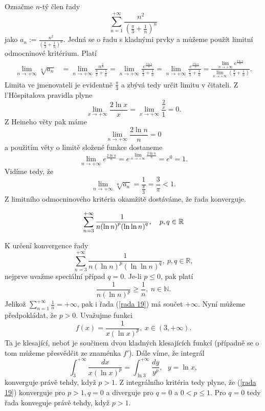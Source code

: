 \documentclass[answers]{exam}
\let\originalleft\left
\let\originalright\right
\renewcommand{\left}{\mathopen{}\mathclose\bgroup\originalleft}
\renewcommand{\right}{\aftergroup\egroup\originalright}
\begin{document}
\begin{questions}
  \begin{solution}
		Ozna\v cme $n$-t\'y \v clen \v rady 
		$$\sum\limits_{n=1}^{+\infty}\frac{n^2}{(\frac{\pi}{3}+\frac{1}{n})^n}$$
		jako $a_n:=\frac{n^2}{(\frac{\pi}{3}+\frac{1}{n})^n}$. Jedn\'a se o \v radu s kladn\'ymi prvky a m\r u\v zeme pou\v z\'it limitní odmocninové krit\'erium. Plat\'i 
		\begin{align*}
		\lim\limits_{n\to+\infty}\sqrt[n]{a_n}&=\lim\limits_{n\to+\infty}\frac{n^\frac{2}{n}}{\frac{\pi}{3}+\frac{1}{n}}=\lim\limits_{n\to+\infty}\frac{e^\frac{2\ln n}{n}}{\frac{\pi}{3}+\frac{1}{n}}=\lim\limits_{n\to+\infty}\frac{e^\frac{2\ln n}{n}}{\frac{\pi}{3}+\frac{1}{n}}=\frac{\lim\limits_{n\to+\infty}e^\frac{2\ln n}{n}}{\lim\limits_{n\to+\infty}(\frac{\pi}{3}+\frac{1}{n})}.
		\end{align*}
		Limita ve jmenovateli je evidentn\v e $\frac{\pi}{3}$ a zb\'yv\'a tedy ur\v cit limitu v \v citateli. Z l'H\^{o}spitalova pravidla plyne 
		$$\lim\limits_{x\to+\infty}\frac{2\ln x}{x}=\lim\limits_{x\to+\infty}\frac{\frac{2}{x}}{1}=0.$$
		Z Heineho v\v ety pak m\'ame
		$$\lim\limits_{n\to+\infty}\frac{2\ln n}{n}=0$$
		a pou\v zit\'im v\v ety o limit\v e slo\v zen\'e funkce dostaneme 
		$$\lim\limits_{n\to+\infty}e^{\frac{2\ln n}{n}}=e^{\lim\limits_{n\to+\infty}{\frac{2\ln n}{n}}}=e^0=1.$$
		Vid\'ime tedy, \v ze 
		$$\lim\limits_{n\to+\infty}\sqrt[n]{a_n}=\frac{1}{\frac{\pi}{3}}=\frac{3}{\pi}<1.$$
		Z limitního odmocninového krit\'eria okam\v zit\v e dost\'av\'ame, \v ze \v rada konverguje.  
  \end{solution}
  
  \question
  \begin{equation*}
    \sum_{n = 3}^{+\infty}
		\frac{1}{n \left( \ln n \right)^p \left( \ln \ln n \right)^q},
		\quad
		p, q \in \mathbb{R}
  \end{equation*}
  
  \begin{solution}
		K ur\v cen\'i konvergence \v rady
		\begin{equation}\label{rada 19}
		\sum_{n=3}^{+\infty}\frac{1}{n(\ln n)^p(\ln\ln n)^q},\ p,q\in\mathbb R, 
		\end{equation}
		nejprve uva\v zme speci\'aln\'i p\v r\'ipad $q=0$. Je-li $p\le0$, pak plat\'i
		$$\frac{1}{n(\ln n)^p}\ge\frac{1}{n},\ n\in\mathbb N.$$
		Jeliko\v z $\sum_{n=1}^{+\infty}\frac{1}{n}=+\infty$, pak i \v rada (\ref{rada 19}) m\'a sou\v cet $+\infty$. Nyn\'i m\r u\v zeme p\v redpokl\'adat, \v ze $p>0$. Uva\v zujme funkci 
		$$f(x)=\frac{1}{x(\ln x)^p},\ x\in(3,+\infty).$$
		Ta je klesaj\'ic\'i, nebo\v t je sou\v cinem dvou kladn\'ych klesaj\'ic\'ich funkc\'i (p\v r\'ipadn\v e se o tom m\r u\v zeme p\v resv\v ed\v cit ze znam\'enka $f'$). D\'ale v\'ime, \v ze integr\'al
		$$\int_3^{+\infty}\frac{dx}{x(\ln x)^p}=\int_{\ln3}^{+\infty}\frac{dy}{y^p},\ \ \ y=\ln x,$$
		konverguje pr\'av\v e tehdy, kdy\v z $p>1$. Z integr\'aln\'iho krit\'eria tedy plyne, \v ze (\ref{rada 19}) konverguje pro $p>1,q=0$ a diverguje pro $q=0$ a $0<p\le 1$. Pro $q=0$ tedy \v rada konveguje pr\'av\v e tehdy, kdy\v z $p>1$.
		

\end{solution}
\end{questions}
\end{document}
